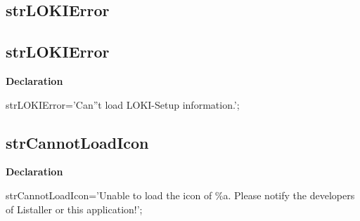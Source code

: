 \documentclass{report}
\newif\ifpdf
\begin{document}
\subsection*{\large{\textbf{strLOKIError}}\normalsize\hspace{1ex}\hrulefill}
\else
\subsection*{strLOKIError}
\fi
\label{trstrings-strLOKIError}
\begin{list}{}{
\setlength{\itemindent}{0cm}
\setlength{\listparindent}{0cm}
\setlength{\leftmargin}{\evensidemargin}
\addtolength{\leftmargin}{\tmplength}
\settowidth{\labelsep}{X}
\addtolength{\leftmargin}{\labelsep}
\setlength{\labelwidth}{\tmplength}
}
\item[\textbf{Declaration}\hfill]
\ifpdf
\begin{flushleft}
\fi
\begin{ttfamily}
strLOKIError='Can''t load LOKI-Setup information.';\end{ttfamily}

\ifpdf
\end{flushleft}
\fi

\end{list}
\ifpdf
\subsection*{\large{\textbf{strCannotLoadIcon}}\normalsize\hspace{1ex}\hrulefill}
\else
\subsection*{strCannotLoadIcon}
\fi
\label{trstrings-strCannotLoadIcon}
\begin{list}{}{
\setlength{\itemindent}{0cm}
\setlength{\listparindent}{0cm}
\setlength{\leftmargin}{\evensidemargin}
\addtolength{\leftmargin}{\tmplength}
\settowidth{\labelsep}{X}
\addtolength{\leftmargin}{\labelsep}
\setlength{\labelwidth}{\tmplength}
}
\item[\textbf{Declaration}\hfill]
\ifpdf
\begin{flushleft}
\fi
\begin{ttfamily}
strCannotLoadIcon='Unable to load the icon of {\%}a. Please notify the developers of Listaller or this application!';\end{ttfamily}

\ifpdf
\end{flushleft}
\fi

\end{list}
\ifpdf
\end{document}
